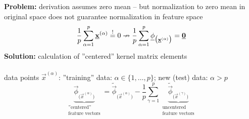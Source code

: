 \noindent \textbf{Problem: } derivation assumes zero mean -- but
normalization to zero mean in original space does not guarantee normalization in
feature space
\begin{equation}
        \frac{1}{p} \sum\limits_{\alpha = 1}^p \underline{\mathbf{x}}^{(\alpha)} \stackrel{\mathrm{!}}{=} 0
        \nrightarrow \frac{1}{p} \sum\limits_{\alpha = 1}^p 
                \underline{\mathbf{\phi}}_{\big( \underline{\mathbf{x}}^{(\alpha)} \big)} = \underline{\mathbf{0}}
\end{equation}
\textbf{Solution:} calculation of ''centered'' kernel matrix elements 
\\\\
data points $\vec{x}^{(\alpha)}$: ''training'' data: $\alpha \in \{1, \ldots, p\}$; new (test) data: $\alpha > p$
\begin{equation}
        \underbrace{ \vec{\phi}_{\big( \vec{x}^{(\alpha)} \big)} }_{
                \substack{      \text{''centered''} \\
                                \text{feature vectors}} }
        = \widetilde{\vec{\phi}}_{\big( \vec{x}^{(\alpha)} \big)}
                - \frac{1}{p} \sum\limits_{\gamma = 1}^p 
                \underbrace{ \widetilde{\vec{\phi}}_{\big( \vec{x}^{(\gamma)} 
                                \big)} }_{
                        \substack{      \text{uncentered} \\
                                        \text{feature vectors}} }
\end{equation}
